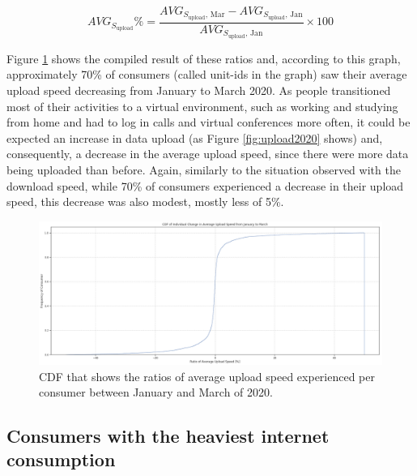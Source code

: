 \documentclass[conference,10pt]{IEEEtran}
\begin{document}
\begin{equation}
AVG_{S_{\text{upload}}}\% = \frac{AVG_{S_{\text{upload}},\, \text{Mar}}-AVG_{S_{\text{upload}},\, \text{Jan}}}{AVG_{S_{\text{upload}},\, \text{Jan}}}\times 100
\end{equation}


Figure \ref{fig:uploadspeed2020} shows the compiled result of these ratios and, according to this graph, approximately 70\% of consumers (called unit-ids in the graph) saw their average upload speed decreasing from January to March 2020. As people transitioned most of their activities to a virtual environment, such as working and studying from home and had to log in calls and virtual conferences more often, it could be expected an increase in data upload (as Figure \ref{fig:upload2020} shows) and, consequently, a decrease in the average upload speed, since there were more data being uploaded than before. Again, similarly to the situation observed with the download speed, while 70\% of consumers experienced a decrease in their upload speed, this decrease was also modest, mostly less of 5\%.

\begin{figure}
\centering
\includegraphics[width=1.0\linewidth]{figs/uploadspeed.PNG}
\caption{CDF that shows the ratios of average upload speed experienced per consumer between January and March of 2020.}
\label{fig:uploadspeed2020}
\end{figure}

\subsection{Consumers with the heaviest internet consumption}
\label{sec:analyzing-the-users-with-the-highest-internet-usage}
\end{document}
